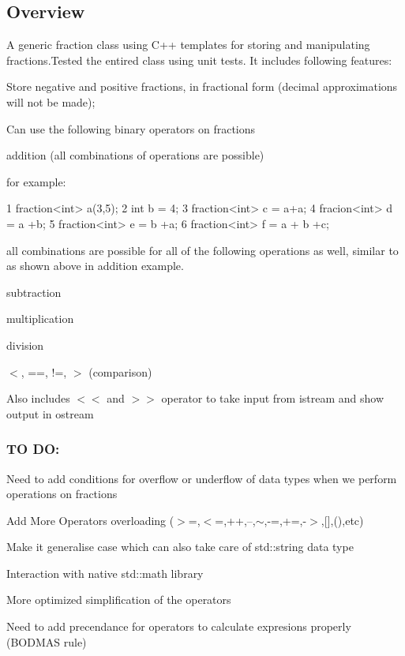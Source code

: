 \href{https://opensource.org/licenses/MIT}{\tt }

\subsection*{Overview}

A generic fraction class using C++ templates for storing and manipulating fractions.\+Tested the entired class using unit tests. It includes following features\+:
\begin{DoxyItemize}
\item Store negative and positive fractions, in fractional form (decimal approximations will not be made);
\item Can use the following binary operators on fractions
\item addition (all combinations of operations are possible)
\end{DoxyItemize}

for example\+: 
\begin{DoxyCode}
1 fraction<int> a(3,5);
2 int b = 4;
3 fraction<int> c = a+a;
4 fracion<int> d = a +b;
5 fraction<int> e = b +a;
6 fraction<int> f = a + b +c;
\end{DoxyCode}
 all combinations are possible for all of the following operations as well, similar to as shown above in addition example.
\begin{DoxyItemize}
\item subtraction
\item multiplication
\item division
\item $<$, ==, !=, $>$ (comparison)
\end{DoxyItemize}

Also includes $<$$<$ and $>$$>$ operator to take input from istream and show output in ostream

\subsubsection*{TO DO\+:}


\begin{DoxyItemize}
\item Need to add conditions for overflow or underflow of data types when we perform operations on fractions
\item Add More Operators overloading ($>$=,$<$=,++,--,$\sim$,-\/=,+=,-\/$>$,\mbox{[}\mbox{]},(),etc)
\item Make it generalise case which can also take care of std\+::string data type
\item Interaction with native std\+::math library
\item More optimized simplification of the operators
\item Need to add precendance for operators to calculate expresions properly (B\+O\+D\+M\+AS rule)
\end{DoxyItemize}

